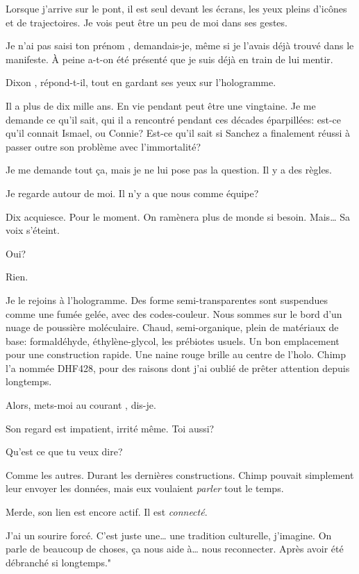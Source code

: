 Lorsque j'arrive sur le pont, il est seul devant les écrans, les yeux pleins d'icônes et de trajectoires. Je vois peut être un peu de moi dans ses gestes.

\og Je n'ai pas saisi ton prénom \fg , demandais-je, même si je l'avais déjà trouvé dans le manifeste. À peine a-t-on été présenté que je suis déjà en train de lui mentir.

\og Dixon \fg, répond-t-il, tout en gardant ses yeux sur l'hologramme.

Il a plus de dix mille ans. En vie pendant peut être une vingtaine. Je me demande ce qu'il sait, qui il a rencontré pendant ces décades éparpillées: est-ce qu'il connait Ismael, ou Connie? Est-ce qu'il sait si Sanchez a finalement réussi à passer outre son problème avec l'immortalité?

Je me demande tout ça, mais je ne lui pose pas la question. Il y a des règles.

Je regarde autour de moi. \og Il n’y a que nous comme équipe?\fg

Dix acquiesce. \og Pour le moment. On ramènera plus de monde si besoin. Mais\ldots\fg{} Sa voix s'éteint.

\og Oui? \fg

\og Rien. \fg

Je le rejoins à l'hologramme. Des forme semi-transparentes sont suspendues comme une fumée gelée, avec des codes-couleur. Nous sommes sur le bord d'un nuage de poussière mo\-lé\-cu\-laire. Chaud, semi-or\-ga\-nique, plein de ma\-té\-riaux de base: for\-mal\-dé\-hyde, éthylène-glycol, les pré\-biotes usu\-els. Un bon emplacement pour une construction rapide. Une naine rouge brille au centre de l'holo. Chimp l'a nommée DHF428, pour des raisons dont j'ai oublié de prêter attention depuis longtemps.

\og Alors, mets-moi au courant \fg , dis-je.

Son regard est impatient, irrité même. \og Toi aussi? \fg

\og Qu'est ce que tu veux dire? \fg

\og Comme les autres. Durant les dernières constructions. Chimp pouvait simplement leur envoyer les données, mais eux voulaient \emph{parler} tout le temps.\fg

Merde, son lien est encore actif. Il est \emph{connecté}.

J'ai un sourire forcé. \og C'est juste une\ldots{} une tradition culturelle, j'imagine. On parle de beaucoup de choses, ça nous aide à\ldots{} nous reconnecter. Après avoir été débranché si longtemps."

